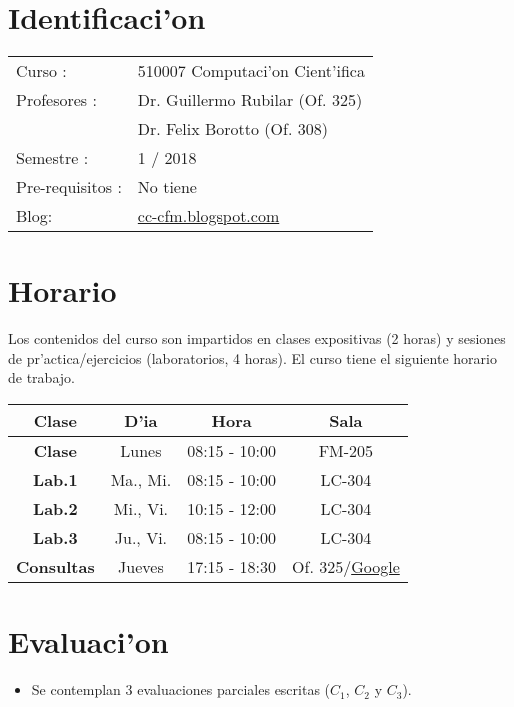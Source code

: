 \documentclass[letterpaper,11pt]{exam}
\begin{document}
\begin{multicols}{2}
\section{Identificaci'on}
\begin{center}
		\begin{tabular}{ll}
		Curso  :& 510007 Computaci'on Cient'ifica \\
		Profesores :& Dr. Guillermo Rubilar (Of. 325)\\
		& Dr. Felix Borotto (Of. 308)\\
		Semestre : & 1 / 2018 \\
		Pre-requisitos : & No tiene \\
		Blog: & \href{https://cc-cfm.blogspot.com}{cc-cfm.blogspot.com} 
		\end{tabular}
\end{center}

\section{Horario}
Los contenidos del curso son impartidos en clases expositivas (2 horas) y sesiones de pr'actica/ejercicios (laboratorios, 4 horas). El curso tiene el siguiente horario de trabajo.
\begin{center}
\begin{scriptsize}
\begin{tabular}{|cccc|}
\hline 
\textbf{Clase} & \textbf{D'ia} & \textbf{Hora} & \textbf{Sala} \\ 
\hline \textbf{Clase} & Lunes & 08:15 - 10:00  &  FM-205 \\
\hline \textbf{Lab.1} & Ma., Mi. & 08:15 - 10:00  &  LC-304 \\
\hline \textbf{Lab.2} & Mi., Vi. & 10:15 - 12:00  &  LC-304 \\
\hline \textbf{Lab.3} & Ju., Vi. & 08:15 - 10:00 &  LC-304 \\
\hline \textbf{Consultas} & Jueves & 17:15 - 18:30 & Of. 325/\href{http://www.google.com/profiles/gfrubi}{Google} \\
\hline 
\end{tabular} 
\end{scriptsize}
\end{center}
\section{Evaluaci'on}
\begin{itemize}
\item Se contemplan 3 evaluaciones parciales escritas ($C_1$, $C_2$ y $C_3$).  


\end{itemize}
\end{multicols}
\end{document}
